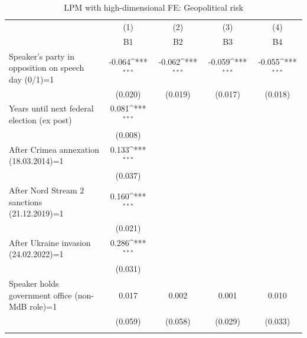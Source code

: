 \begin{table}[htbp]\centering
\def\sym#1{\ifmmode^{#1}\else\(^{#1}\)\fi}
\caption{LPM with high-dimensional FE: Geopolitical risk}
\begin{tabular}{l*{4}{c}}
\toprule
                    &\multicolumn{1}{c}{(1)}&\multicolumn{1}{c}{(2)}&\multicolumn{1}{c}{(3)}&\multicolumn{1}{c}{(4)}\\
                    &\multicolumn{1}{c}{B1}&\multicolumn{1}{c}{B2}&\multicolumn{1}{c}{B3}&\multicolumn{1}{c}{B4}\\
\midrule
Speaker's party in opposition on speech day (0/1)=1&      -0.064\sym{***}&      -0.062\sym{***}&      -0.059\sym{***}&      -0.055\sym{***}\\
                    &     (0.020)         &     (0.019)         &     (0.017)         &     (0.018)         \\
\addlinespace
Years until next federal election (ex post)&       0.081\sym{***}&                     &                     &                     \\
                    &     (0.008)         &                     &                     &                     \\
\addlinespace
After Crimea annexation (18.03.2014)=1&       0.133\sym{***}&                     &                     &                     \\
                    &     (0.037)         &                     &                     &                     \\
\addlinespace
After Nord Stream 2 sanctions (21.12.2019)=1&       0.160\sym{***}&                     &                     &                     \\
                    &     (0.021)         &                     &                     &                     \\
\addlinespace
After Ukraine invasion (24.02.2022)=1&       0.286\sym{***}&                     &                     &                     \\
                    &     (0.031)         &                     &                     &                     \\
\addlinespace
Speaker holds government office (non-MdB role)=1&       0.017         &       0.002         &       0.001         &       0.010         \\
                    &     (0.059)         &     (0.058)         &     (0.029)         &     (0.033)         \\
\addlinespace

\end{tabular}
\end{table}
